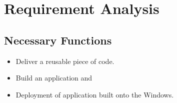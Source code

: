 \documentclass[openany,12pt]{report}
\begin{document}

	
	
	\section{Requirement Analysis}
	
	\subsection{Necessary Functions}
	\begin{itemize}
		\item{Deliver a reusable piece of code.}
		\item{Build an application and}
		\item{Deployment of application built onto the Windows.}
	\end{itemize}
	
\end{document}

